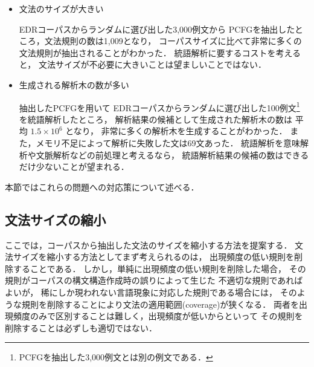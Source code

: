 \begin{itemize}


\item 文法のサイズが大きい

  \quad EDRコーパスからランダムに選び出した3,000例文から
  PCFGを抽出したところ，文法規則の数は1,009となり，
  コーパスサイズに比べて非常に多くの文法規則が抽出されることがわかった．
  統語解析に要するコストを考えると，
  文法サイズが不必要に大きいことは望ましいことではない．

\item 生成される解析木の数が多い

  \quad 抽出したPCFGを用いて
  EDRコーパスからランダムに選び出した100例文\footnote{
    PCFGを抽出した3,000例文とは別の例文である．
    }
  を統語解析したところ，
  解析結果の候補として生成された解析木の数は
  平均 $1.5 \times 10^6$ となり，
  非常に多くの解析木を生成することがわかった．
  また，メモリ不足によって解析に失敗した文は69文あった．
  統語解析を意味解析や文脈解析などの前処理と考えるなら，
  統語解析結果の候補の数はできるだけ少ないことが望まれる．
\end{itemize}
本節ではこれらの問題への対応策について述べる．
\subsection{文法サイズの縮小}
\label{sec:文法サイズの縮小}

ここでは，コーパスから抽出した文法のサイズを縮小する方法を提案する．
文法サイズを縮小する方法としてまず考えられるのは，
出現頻度の低い規則を削除することである．
しかし，単純に出現頻度の低い規則を削除した場合，
その規則がコーパスの構文構造作成時の誤りによって生じた
不適切な規則であればよいが，
稀にしか現われない言語現象に対応した規則である場合には，
そのような規則を削除することにより文法の適用範囲(coverage)が狭くなる．
両者を出現頻度のみで区別することは難しく，出現頻度が低いからといって
その規則を削除することは必ずしも適切ではない．



